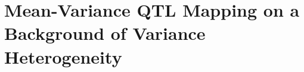 \chapter{Mean-Variance QTL Mapping on a Background of Variance Heterogeneity}
\label{chap:bvh}

\lipsum